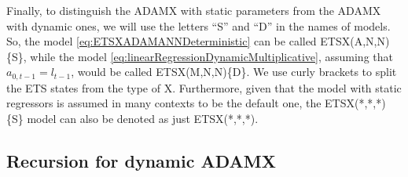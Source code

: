 \documentclass[
]{book}
\theoremstyle{definition}
\theoremstyle{definition}
\theoremstyle{definition}
\theoremstyle{definition}
\theoremstyle{remark}
\begin{document}
Finally, to distinguish the ADAMX with static parameters from the ADAMX with dynamic ones, we will use the letters ``S'' and ``D'' in the names of models. So, the model \eqref{eq:ETSXADAMANNDeterministic} can be called ETSX(A,N,N)\{S\}, while the model \eqref{eq:linearRegressionDynamicMultiplicative}, assuming that \(a_{0,t-1}=l_{t-1}\), would be called ETSX(M,N,N)\{D\}. We use curly brackets to split the ETS states from the type of X. Furthermore, given that the model with static regressors is assumed in many contexts to be the default one, the ETSX(*,*,*)\{S\} model can also be denoted as just ETSX(*,*,*).

\hypertarget{ADAMXDynamicMoments}{%
\subsection{Recursion for dynamic ADAMX}\label{ADAMXDynamicMoments}}
\end{document}
